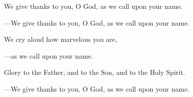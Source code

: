 \responsory
\begin{hangpar}

We give thanks to you, O God, as we call upon your name.

{\color{red}---\thinspace}We give thanks to you, O God, as we call upon your name.

\medskip We cry aloud how marvelous you are,

{\color{red}---\thinspace}as we call upon your name.

\medskip Glory to the Father, and to the Son, and to the Holy Spirit.

{\color{red}---\thinspace}We give thanks to you, O God, as we call upon your name.
\end{hangpar}
